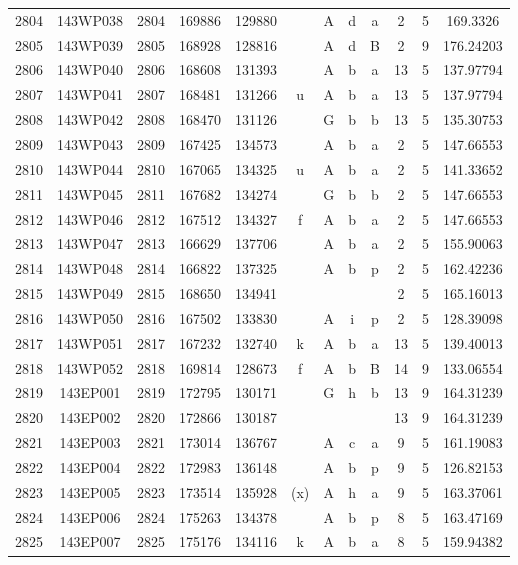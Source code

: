 \begin{tabular}{|*{12}{c|}}
2804 & 143WP038 & 2804 & 169886 & 129880 &  & A & d & a & 2 & 5 & 169.3326 \\ 
2805 & 143WP039 & 2805 & 168928 & 128816 &  & A & d & B & 2 & 9 & 176.24203 \\ 
2806 & 143WP040 & 2806 & 168608 & 131393 &  & A & b & a & 13 & 5 & 137.97794 \\ 
2807 & 143WP041 & 2807 & 168481 & 131266 & u & A & b & a & 13 & 5 & 137.97794 \\ 
2808 & 143WP042 & 2808 & 168470 & 131126 &  & G & b & b & 13 & 5 & 135.30753 \\ 
2809 & 143WP043 & 2809 & 167425 & 134573 &  & A & b & a & 2 & 5 & 147.66553 \\ 
2810 & 143WP044 & 2810 & 167065 & 134325 & u & A & b & a & 2 & 5 & 141.33652 \\ 
2811 & 143WP045 & 2811 & 167682 & 134274 &  & G & b & b & 2 & 5 & 147.66553 \\ 
2812 & 143WP046 & 2812 & 167512 & 134327 & f & A & b & a & 2 & 5 & 147.66553 \\ 
2813 & 143WP047 & 2813 & 166629 & 137706 &  & A & b & a & 2 & 5 & 155.90063 \\ 
2814 & 143WP048 & 2814 & 166822 & 137325 &  & A & b & p & 2 & 5 & 162.42236 \\ 
2815 & 143WP049 & 2815 & 168650 & 134941 &  &  &  &  & 2 & 5 & 165.16013 \\ 
2816 & 143WP050 & 2816 & 167502 & 133830 &  & A & i & p & 2 & 5 & 128.39098 \\ 
2817 & 143WP051 & 2817 & 167232 & 132740 & k & A & b & a & 13 & 5 & 139.40013 \\ 
2818 & 143WP052 & 2818 & 169814 & 128673 & f & A & b & B & 14 & 9 & 133.06554 \\ 
2819 & 143EP001 & 2819 & 172795 & 130171 &  & G & h & b & 13 & 9 & 164.31239 \\ 
2820 & 143EP002 & 2820 & 172866 & 130187 &  &  &  &  & 13 & 9 & 164.31239 \\ 
2821 & 143EP003 & 2821 & 173014 & 136767 &  & A & c & a & 9 & 5 & 161.19083 \\ 
2822 & 143EP004 & 2822 & 172983 & 136148 &  & A & b & p & 9 & 5 & 126.82153 \\ 
2823 & 143EP005 & 2823 & 173514 & 135928 & (x) & A & h & a & 9 & 5 & 163.37061 \\ 
2824 & 143EP006 & 2824 & 175263 & 134378 &  & A & b & p & 8 & 5 & 163.47169 \\ 
2825 & 143EP007 & 2825 & 175176 & 134116 & k & A & b & a & 8 & 5 & 159.94382 \\ 

\end{tabular}
